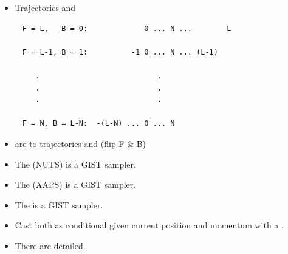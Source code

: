 \documentclass[10pt]{report}
\begin{document}
\begin{itemize}
\item Trajectories  and 
\end{itemize}
\begin{verbatim}
     F = L,   B = 0:             0 ... N ...        L

     F = L-1, B = 1:          -1 0 ... N ... (L-1)

        .                           .
        .                           .
        .                           .

     F = N, B = L-N:  -(L-N) ... 0 ... N
\end{verbatim}
\begin{itemize}
\item are  to trajectories 
  and  (flip F \& B)
\end{itemize}

\begin{itemize}
\item The  (NUTS) is a GIST sampler.
\item The  (AAPS) is a GIST sampler.
\item The  is a GIST sampler.
\item Cast both as conditional  given
  current position and momentum with a .
\item There are detailed .
\end{itemize}
\end{document}
